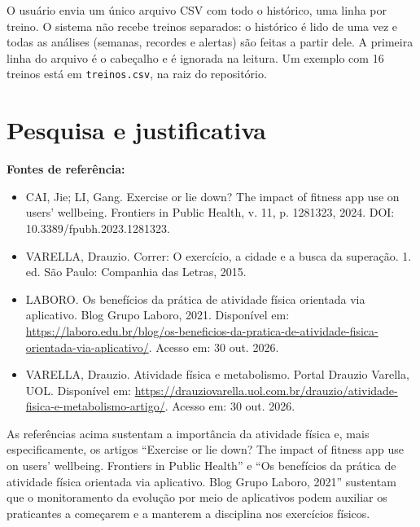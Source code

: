 \documentclass[12pt,a4paper]{article}
\begin{document}
O usuário envia um único arquivo CSV com todo o histórico, uma linha por treino. O
sistema não recebe treinos separados: o histórico é lido de uma vez e todas as análises
(semanas, recordes e alertas) são feitas a partir dele. A primeira linha do arquivo é o
cabeçalho e é ignorada na leitura. Um exemplo com 16 treinos está em
\texttt{treinos.csv}, na raiz do repositório.

\section{Pesquisa e justificativa}

\noindent\textbf{Fontes de referência:}

\begin{itemize}[leftmargin=0.6cm, itemsep=0.5em]
  \item[] CAI, Jie; LI, Gang. Exercise or lie down? The impact of fitness app use on
        users' wellbeing. Frontiers in Public Health, v. 11, p. 1281323, 2024. DOI:
        10.3389/fpubh.2023.1281323.
  \item[] VARELLA, Drauzio. Correr: O exercício, a cidade e a busca da superação. 1. ed.
        São Paulo: Companhia das Letras, 2015.
  \item[] LABORO. Os benefícios da prática de atividade física orientada via aplicativo.
        Blog Grupo Laboro, 2021. Disponível em:
        \url{https://laboro.edu.br/blog/os-beneficios-da-pratica-de-atividade-fisica-orientada-via-aplicativo/}.
        Acesso em: 30 out. 2026.
  \item[] VARELLA, Drauzio. Atividade física e metabolismo. Portal Drauzio Varella, UOL.
        Disponível em:
        \url{https://drauziovarella.uol.com.br/drauzio/atividade-fisica-e-metabolismo-artigo/}.
        Acesso em: 30 out. 2026.
\end{itemize}

As referências acima sustentam a importância da atividade física e, mais
especificamente, os artigos ``Exercise or lie down? The impact of fitness app use on
users' wellbeing. Frontiers in Public Health'' e ``Os benefícios da prática de
atividade física orientada via aplicativo. Blog Grupo Laboro, 2021'' sustentam que o
monitoramento da evolução por meio de aplicativos podem auxiliar os praticantes a
começarem e a manterem a disciplina nos exercícios físicos.

\end{document}
